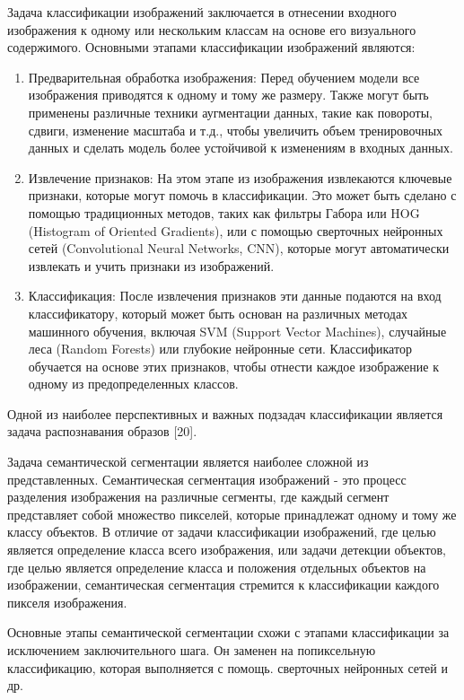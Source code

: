 \documentclass[14pt, russian]{scrartcl}
\begin{document}
Задача классификации изображений заключается в отнесении входного изображения к одному или нескольким классам на основе его визуального содержимого. Основными этапами классификации изображений являются:

\begin{enumerate}
    \item Предварительная обработка изображения: Перед обучением модели все изображения приводятся к одному и тому же размеру. Также могут быть применены различные техники аугментации данных, такие как повороты, сдвиги, изменение масштаба и т.д., чтобы увеличить объем тренировочных данных и сделать модель более устойчивой к изменениям в входных данных.
    \item Извлечение признаков: На этом этапе из изображения извлекаются ключевые признаки, которые могут помочь в классификации. Это может быть сделано с помощью традиционных методов, таких как фильтры Габора или HOG (Histogram of Oriented Gradients), или с помощью сверточных нейронных сетей (Convolutional Neural Networks, CNN), которые могут автоматически извлекать и учить признаки из изображений.
    \item Классификация: После извлечения признаков эти данные подаются на вход классификатору, который может быть основан на различных методах машинного обучения, включая SVM (Support Vector Machines), случайные леса (Random Forests) или глубокие нейронные сети. Классификатор обучается на основе этих признаков, чтобы отнести каждое изображение к одному из предопределенных классов.
\end{enumerate}

Одной из наиболее перспективных и важных подзадач классификации является задача распознавания образов [20].

Задача семантической сегментации является наиболее сложной из представленных. Семантическая сегментация изображений - это процесс разделения изображения на различные сегменты, где каждый сегмент представляет собой множество пикселей, которые принадлежат одному и тому же классу объектов. В отличие от задачи классификации изображений, где целью является определение класса всего изображения, или задачи детекции объектов, где целью является определение класса и положения отдельных объектов на изображении, семантическая сегментация стремится к классификации каждого пикселя изображения.

Основные этапы семантической сегментации схожи с этапами классификации за исключением заключительного шага. Он заменен на попиксельную классификацию, которая выполняется с помощь. сверточных нейронных сетей и др.
\end{document}
